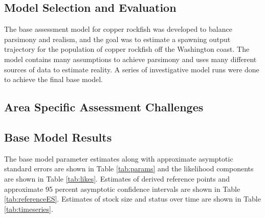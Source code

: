 \documentclass[11pt,
  english,
  a4paper,
]{article}
\begin{document}
\leavevmode\tagmcend\tagstructend\par


\hypertarget{model-selection-and-evaluation}{%
\subsection{Model Selection and Evaluation}\label{model-selection-and-evaluation}}

\leavevmode\tagmcend\tagstructend


The base assessment model for copper rockfish was developed to balance parsimony and realism, and the goal was to estimate a spawning output trajectory for the population of copper rockfish off the Washington coast. The model contains many assumptions to achieve parsimony and uses many different sources of data to estimate reality. A series of investigative model runs were done to achieve the final base model.

\leavevmode\tagmcend\tagstructend\par


\hypertarget{area-specific-assessment-challenges}{%
\subsection{Area Specific Assessment Challenges}\label{area-specific-assessment-challenges}}

\leavevmode\tagmcend\tagstructend


\hypertarget{base-model-results}{%
\subsection{Base Model Results}\label{base-model-results}}

\leavevmode\tagmcend\tagstructend


The base model parameter estimates along with approximate asymptotic standard errors are shown in Table \ref{tab:params} and the likelihood components are shown in Table \ref{tab:likes}. Estimates of derived reference points and approximate 95 percent asymptotic confidence intervals are shown in Table \ref{tab:referenceES}. Estimates of stock size and status over time are shown in Table \ref{tab:timeseries}.
\end{document}

